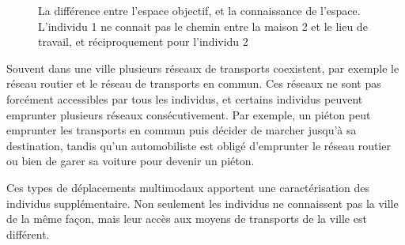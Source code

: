 \documentclass[a4paper]{article}
\begin{document}
\begin{figure}
  \centering
  \caption{La différence entre l'espace objectif, et la connaissance de
  l'espace. L'individu 1 ne connait pas le chemin entre la maison 2 et le lieu
  de travail, et réciproquement pour l'individu 2}
  \label{fig:espace}
\end{figure}

Souvent dans une ville plusieurs réseaux de transports coexistent, par exemple
le réseau routier et le réseau de transports en commun. Ces réseaux ne sont pas
forcément accessibles par tous les individus, et certains individus peuvent
emprunter plusieurs réseaux consécutivement. Par exemple, un piéton peut
emprunter les transports en commun puis décider de marcher jusqu'à sa
destination, tandis qu'un automobiliste est obligé d'emprunter le réseau routier
ou bien de garer sa voiture pour devenir un piéton.

Ces types de déplacements multimodaux apportent une caractérisation des
individus supplémentaire. Non seulement les individus ne connaissent pas la
ville de la même façon, mais leur accès aux moyens de transports de la ville est
différent.
\end{document}
